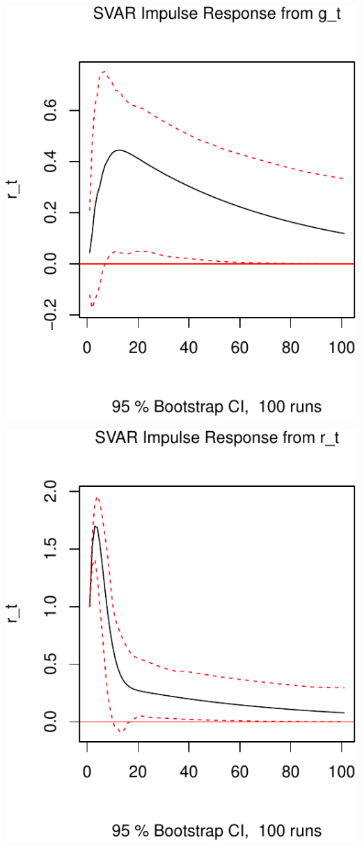 \documentclass[11pt,preprint, authoryear]{elsarticle}
\numberwithin{equation}{section}
\numberwithin{figure}{section}
\numberwithin{table}{section}
\begin{document}
\includegraphics{TS_proj_files/figure-latex/unnamed-chunk-18-1.pdf}

\includegraphics{TS_proj_files/figure-latex/unnamed-chunk-19-1.pdf}
\end{document}
